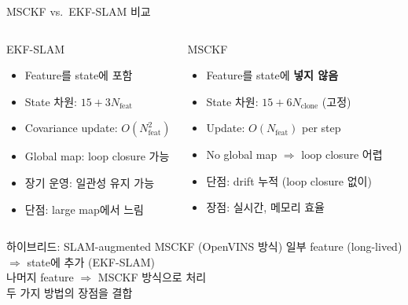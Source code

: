 \begin{frame}{MSCKF vs.\ EKF-SLAM 비교}
  \begin{columns}[T]
      \begin{block}{EKF-SLAM}
        \begin{itemize}
          \item Feature를 state에 포함
          \item State 차원: $15 + 3N_\text{feat}$
          \item Covariance update: $O(N_\text{feat}^2)$
          \item Global map: loop closure 가능
          \item 장기 운영: 일관성 유지 가능
          \item 단점: large map에서 느림
        \end{itemize}
      \end{block}
      \begin{block}{MSCKF}
        \begin{itemize}
          \item Feature를 state에 \textbf{넣지 않음}
          \item State 차원: $15 + 6N_\text{clone}$ (고정)
          \item Update: $O(N_\text{feat})$ per step
          \item No global map $\Rightarrow$ loop closure 어렵
          \item 단점: drift 누적 (loop closure 없이)
          \item 장점: 실시간, 메모리 효율
        \end{itemize}
      \end{block}
  \end{columns}
  \vspace{0.3em}
  \begin{exampleblock}{하이브리드: SLAM-augmented MSCKF (OpenVINS 방식)}
    일부 feature (long-lived) $\Rightarrow$ state에 추가 (EKF-SLAM) \\
    나머지 feature $\Rightarrow$ MSCKF 방식으로 처리 \\
    두 가지 방법의 장점을 결합
  \end{exampleblock}
\end{frame}

